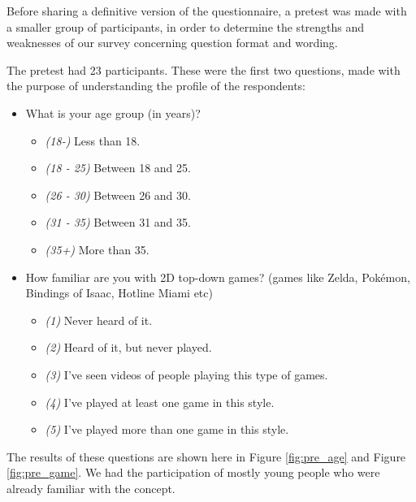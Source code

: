 Before sharing a definitive version of the questionnaire, a pretest was made with a smaller group of participants, in order to determine the strengths and weaknesses of our survey concerning question format and wording.

The pretest had 23 participants. These were the first two questions, made with the purpose of understanding the profile of the respondents:
\begin{itemize}
    \item What is your age group (in years)?
    \begin{itemize}
        \item \emph{(18-)} Less than 18.
        \item \emph{(18 - 25)} Between 18 and 25.
        \item \emph{(26 - 30)} Between 26 and 30.
        \item \emph{(31 - 35)} Between 31 and 35.
        \item \emph{(35+)} More than 35.
    \end{itemize}
    \item How familiar are you with 2D top-down games? (games like Zelda, Pokémon, Bindings of Isaac, Hotline Miami etc)
    \begin{itemize}
        \item \emph{(1)} Never heard of it.
        \item \emph{(2)} Heard of it, but never played.
        \item \emph{(3)} I've seen videos of people playing this type of games.
        \item \emph{(4)} I've played at least one game in this style.
        \item \emph{(5)} I've played more than one game in this style.
    \end{itemize}
\end{itemize}

The results of these questions are shown here in Figure \ref{fig:pre_age} and Figure \ref{fig:pre_game}. We had the participation of mostly young people who were already familiar with the concept.

